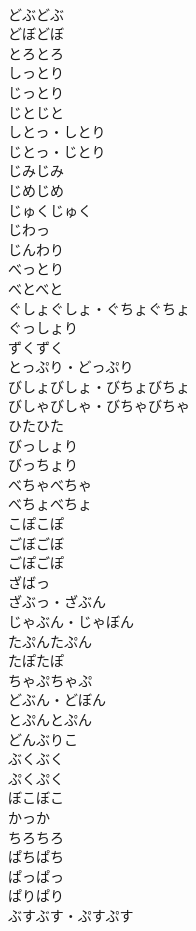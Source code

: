 \documentclass[8pt]{extreport}
\begin{document}
\begin{CJK}{UTF8}{min}
\\	どぶどぶ	
\\	どぼどぼ	
\\	とろとろ	
\\	しっとり	
\\	じっとり	
\\	じとじと	
\\	しとっ・しとり	
\\	じとっ・じとり	
\\	じみじみ	
\\	じめじめ	
\\	じゅくじゅく	
\\	じわっ	
\\	じんわり	
\\	べっとり	
\\	べとべと	
\\	ぐしょぐしょ・ぐちょぐちょ	
\\	ぐっしょり	
\\	ずくずく	
\\	とっぷり・どっぷり	
\\	びしょびしょ・びちょびちょ	
\\	びしゃびしゃ・びちゃびちゃ	
\\	ひたひた	
\\	びっしょり	
\\	びっちょり	
\\	べちゃべちゃ	
\\	べちょべちょ	
\\	こぽこぽ	
\\	ごぼごぼ	
\\	ごぽごぽ	
\\	ざばっ	
\\	ざぶっ・ざぶん	
\\	じゃぶん・じゃぼん	
\\	たぷんたぷん	
\\	たぽたぽ	
\\	ちゃぷちゃぷ	
\\	どぶん・どぼん	
\\	とぷんとぷん	
\\	どんぶりこ	
\\	ぶくぶく	
\\	ぷくぷく	
\\	ぼこぼこ	
\\	かっか	
\\	ちろちろ	
\\	ぱちぱち	
\\	ぱっぱっ	
\\	ぱりぱり	
\\	ぶすぶす・ぷすぷす	

\end{CJK}
\end{document}
